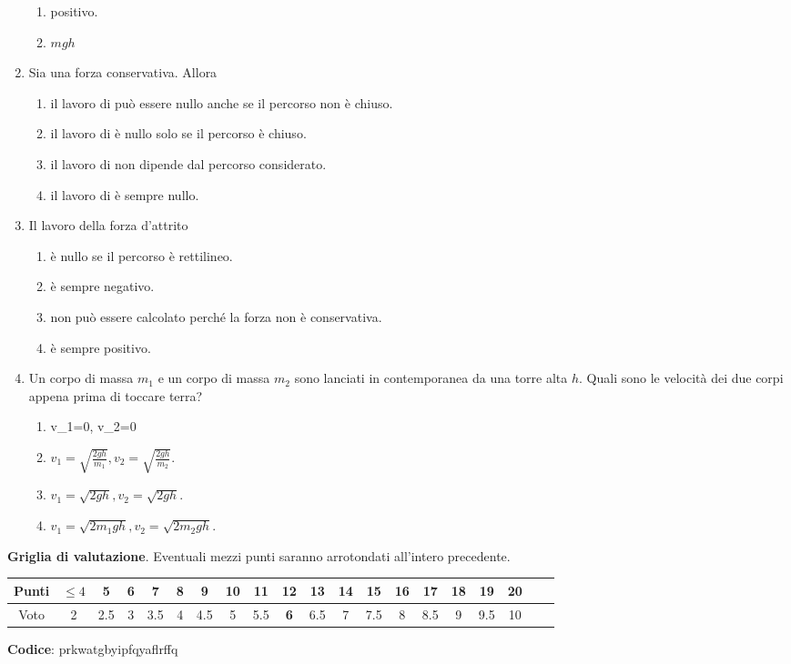 \documentclass{article}
\begin{document}
\begin{enumerate}
\begin{enumerate}[label=\Alph*.]
    \item positivo.
    \item $mgh$
  \end{enumerate}
  \item Sia  una forza conservativa. Allora
  \begin{enumerate}[label=\Alph*.]
    \item il lavoro di  può essere nullo anche se il percorso non è chiuso.
    \item il lavoro di  è nullo solo se il percorso è chiuso.
    \item il lavoro di  non dipende dal percorso considerato.
    \item il lavoro di  è sempre nullo.
  \end{enumerate}
  \item Il lavoro della forza d'attrito
  \begin{enumerate}[label=\Alph*.]
    \item è nullo se il percorso è rettilineo.
    \item è sempre negativo.
    \item non può essere calcolato perché la forza non è conservativa.
    \item è sempre positivo.
  \end{enumerate}
  \item Un corpo di massa $m_1$ e un corpo di massa $m_2$ sono lanciati in contemporanea da una torre alta $h$. Quali sono le velocità dei due corpi appena prima di toccare terra?
  \begin{enumerate}[label=\Alph*.]
    \item v_1=0, v_2=0
    \item $v_1=\sqrt{\frac{2gh}{m_1}}, v_2=\sqrt{\frac{2gh}{m_2}}$.
    \item $v_1=\sqrt{2gh}, v_2=\sqrt{2gh}$.
    \item $v_1=\sqrt{2m_1gh}, v_2=\sqrt{2m_2gh}$.
  \end{enumerate}
\end{enumerate}








\newpage \maketitle \centering \textbf{Griglia di valutazione}. Eventuali mezzi punti saranno arrotondati all'intero precedente. \begin{table}[h]     \centering \begin{tabular}{|c|c|c|c|c|c|c|c|c|c|c|c|c|c|c|c|c|c|c|c|} \hline Punti &  $\leq 4$ & 5 & 6 & 7 & 8 & 9 & 10 & 11 & \textbf{12} & 13 & 14 & 15 & 16 & 17 & 18 & 19 & 20 \\ \hline Voto & 2 & 2.5 & 3 & 3.5 & 4 & 4.5 & 5 & 5.5 & \textbf{6} & 6.5 & 7 & 7.5 & 8 & 8.5 & 9 & 9.5 & 10 \\ \hline \end{tabular} \end{table}
\textbf{Codice}: prkwatgbyipfqyaflrffq
\end{document}
